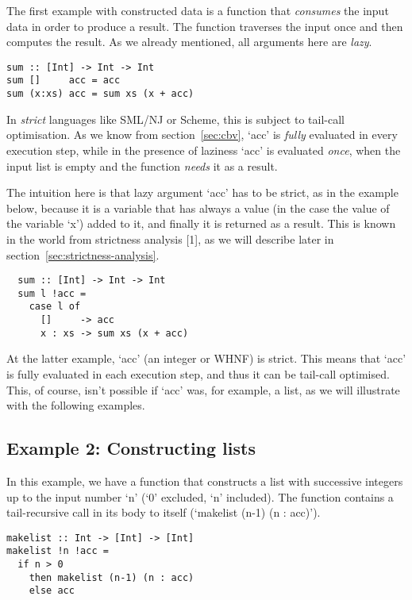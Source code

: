 \documentclass[diploma]{softlab-thesis}
\begin{document}
The first example with constructed data is a 
function that \textit{consumes} the input data in 
order to produce a result.  The function traverses 
the input once and then computes the result. As we 
already mentioned, all arguments here are \textit{lazy}.

\begin{verbatim}
sum :: [Int] -> Int -> Int
sum []     acc = acc
sum (x:xs) acc = sum xs (x + acc)
\end{verbatim}

In \textit{strict} languages like SML/NJ or Scheme,
this is subject to tail-call optimisation. As we know from section~\ref{sec:cbv},
`acc' is \textit{fully} evaluated in every execution step, while in the
presence of laziness `acc' is evaluated \textit{once}, when the input 
list is empty and the function \textit{needs} it as a result.

The intuition here is that lazy argument `acc' has to be strict, as in the example below,
because it is a variable that has always a value (in the case the value of the variable `x') added to it,
and finally it is returned as a result. This is known in the world from strictness analysis [1], as we 
will describe later in section~\ref{sec:strictness-analysis}.

\begin{verbatim}
  sum :: [Int] -> Int -> Int
  sum l !acc = 
    case l of 
      []     -> acc 
      x : xs -> sum xs (x + acc) 
\end{verbatim}

At the latter example, `acc' (an integer or WHNF) is strict. This means that `acc' is 
fully evaluated in each execution step, and thus it can be tail-call optimised. This, of course,
isn't possible if `acc' was, for example, a list, as we will illustrate with the following examples.


\subsection {Example 2: Constructing lists}
\label{sec:example2}

In this example, we have a function that constructs a list with successive 
integers up to the input number `n' (`0' excluded, `n' included). The function contains 
a tail-recursive call in its body to itself (`makelist (n-1) (n : acc)'). 

\begin{verbatim}
makelist :: Int -> [Int] -> [Int]
makelist !n !acc = 
  if n > 0 
    then makelist (n-1) (n : acc)
    else acc
\end{verbatim}
\end{document}
